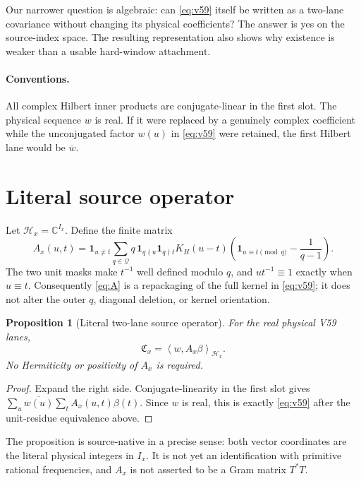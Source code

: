 \documentclass[11pt]{article}
\newtheorem{proposition}{Proposition}
\newcommand{\C}{\mathbb C}
\newcommand{\ip}[2]{\left\langle #1,#2\right\rangle}
\newcommand{\Cx}{\mathfrak C_x}
\begin{document}
Our narrower question is algebraic: can \eqref{eq:v59} itself be written as a
two-lane covariance without changing its physical coefficients?  The answer
is yes on the source-index space.  The resulting representation also shows
why existence is weaker than a usable hard-window attachment.

\paragraph{Conventions.}
All complex Hilbert inner products are conjugate-linear in the first slot.
The physical sequence $w$ is real.  If it were replaced by a genuinely
complex coefficient while the unconjugated factor $w(u)$ in
\eqref{eq:v59} were retained, the first Hilbert lane would be $\overline w$.

\section{Literal source operator}

Let $\mathcal H_x=\C^{I_x}$.  Define the finite matrix
\begin{equation}
 A_x(u,t)=\mathbf1_{u\ne t}\sum_{q\in\mathcal Q}
 q\,\mathbf1_{q\nmid u}\mathbf1_{q\nmid t}K_H(u-t)
 \left(\mathbf1_{u\equiv t\pmod q}-\frac{1}{q-1}\right). \label{eq:A}
\end{equation}
The two unit masks make $t^{-1}$ well defined modulo $q$, and
$u t^{-1}\equiv1$ exactly when $u\equiv t$.  Consequently
\eqref{eq:A} is a repackaging of the full kernel in \eqref{eq:v59}; it
does not alter the outer $q$, diagonal deletion, or kernel orientation.

\begin{proposition}[Literal two-lane source operator]\label{prop:operator}
For the real physical V59 lanes,
\[
 \Cx=\ip{w}{A_x\beta}_{\mathcal H_x}.
\]
No Hermiticity or positivity of $A_x$ is required.
\end{proposition}

\begin{proof}
Expand the right side.  Conjugate-linearity in the first slot gives
$\sum_u\overline{w(u)}\sum_tA_x(u,t)\beta(t)$.  Since $w$ is real,
this is exactly \eqref{eq:v59} after the unit-residue equivalence above.
\end{proof}

The proposition is source-native in a precise sense: both vector coordinates
are the literal physical integers in $I_x$.  It is not yet an identification
with primitive rational frequencies, and $A_x$ is not asserted to be a Gram
matrix $T^*T$.
\end{document}
